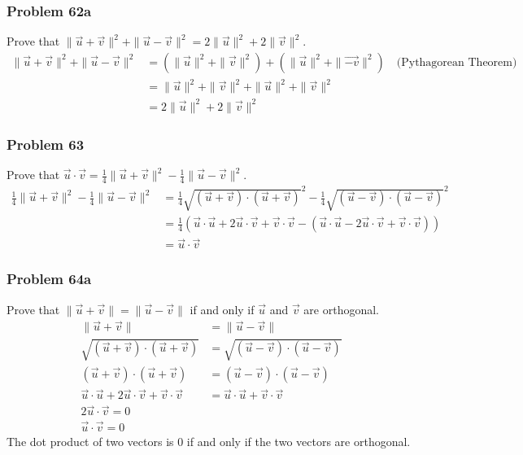 \documentclass[letterpaper, 12pt]{math}
\begin{document}
\subsubsection*{Problem 62a}
Prove that \( \|\vec{u}+\vec{v}\|^2+\|\vec{u}-\vec{v}\|^2 = 2\|\vec{u}\|^2+
2\|\vec{v}\|^2 \).
\begin{align*}
  \|\vec{u}+\vec{v}\|^2+\|\vec{u}-\vec{v}\|^2 &=
    (\|\vec{u}\|^2+\|\vec{v}\|^2)+(\|\vec{u}\|^2+\|\vec{-v}\|^2)
    \quad\text{(Pythagorean Theorem)} \\
  &= \|\vec{u}\|^2+\|\vec{v}\|^2+\|\vec{u}\|^2+\|\vec{v}\|^2 \\
  &= 2\|\vec{u}\|^2+2\|\vec{v}\|^2
\end{align*}

\subsubsection*{Problem 63}
Prove that \( \vec{u}\cdot\vec{v} = \frac{1}{4}\|\vec{u}+\vec{v}\|^2-
\frac{1}{4}\|\vec{u}-\vec{v}\|^2 \).
\begin{align*}
  \frac{1}{4}\|\vec{u}+\vec{v}\|^2-\frac{1}{4}\|\vec{u}-\vec{v}\|^2 &=
    \frac{1}{4}\sqrt{(\vec{u}+\vec{v})\cdot(\vec{u}+\vec{v})}^2-
    \frac{1}{4}\sqrt{(\vec{u}-\vec{v})\cdot(\vec{u}-\vec{v})}^2 \\
  &= \frac{1}{4}(\vec{u}\cdot\vec{u}+2\vec{u}\cdot\vec{v}+\vec{v}\cdot\vec{v}-
    (\vec{u}\cdot\vec{u}-2\vec{u}\cdot\vec{v}+\vec{v}\cdot\vec{v})) \\
  &= \vec{u}\cdot\vec{v}
\end{align*}

\subsubsection*{Problem 64a}
Prove that \( \|\vec{u}+\vec{v}\| = \|\vec{u}-\vec{v}\| \) if and only if
\( \vec{u} \) and \( \vec{v} \) are orthogonal.
\begin{align*}
  \|\vec{u}+\vec{v}\| &= \|\vec{u}-\vec{v}\| \\
  \sqrt{(\vec{u}+\vec{v})\cdot(\vec{u}+\vec{v})} &=
    \sqrt{(\vec{u}-\vec{v})\cdot(\vec{u}-\vec{v})} \\
  (\vec{u}+\vec{v})\cdot(\vec{u}+\vec{v}) &=
    (\vec{u}-\vec{v})\cdot(\vec{u}-\vec{v}) \\
  \vec{u}\cdot\vec{u}+2\vec{u}\cdot\vec{v}+\vec{v}\cdot\vec{v} &=
    \vec{u}\cdot\vec{u}+\vec{v}\cdot\vec{v} \\
  2\vec{u}\cdot\vec{v} = 0 \\
  \vec{u}\cdot\vec{v} = 0
\end{align*}
The dot product of two vectors is 0 if and only if the two vectors are
orthogonal.
\end{document}
